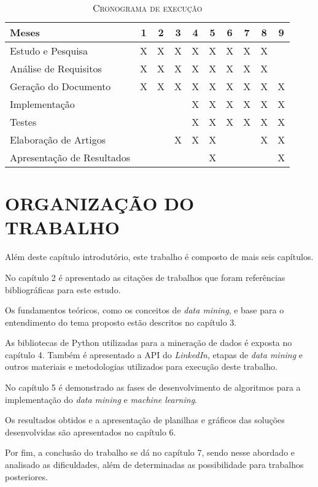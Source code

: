 \renewcommand{\arraystretch}{1.5}

\begin{table}[h!]
  \centering
  \caption{\textsc{Cronograma de execução}}
  \vspace{-0.3cm}
  \begin{tabular}{ | l | c | c | c | c | c | c | c | c | c | }
    \hline
    \textbf{Meses} & \textbf{1} & \textbf{2} & \textbf{3} & \textbf{4} & \textbf{5} & \textbf{6} & \textbf{7} & \textbf{8} & \textbf{9} \\ \hline
    Estudo e Pesquisa & X & X & X & X & X & X & X & X &  \\ \hline
    Análise de Requisitos & X & X & X & X & X & X & X & X &  \\ \hline
    Geração do Documento & X & X & X & X & X & X & X & X & X \\ \hline
    Implementação &  &  &  & X & X & X & X & X & X \\ \hline
    Testes &  &  &  & X & X & X & X & X & X \\ \hline
    Elaboração de Artigos &  &  & X & X & X &  &  & X & X \\ \hline
    Apresentação de Resultados &  &  &  &  & X &  &  &  & X \\
    \hline
  \end{tabular}
  \label{cronograma}
\end{table}


\section{ORGANIZAÇÃO DO TRABALHO}\label{sec:organizacao-trabalho}

Além deste capítulo introdutório, este trabalho é composto de mais seis capítulos.

No capítulo 2 é apresentado as citações de trabalhos que foram referências bibliográficas para este estudo.

Os fundamentos teóricos, como os conceitos de \textit{data mining}, e base para o entendimento do tema proposto estão descritos no capítulo 3.

As bibliotecas de Python utilizadas para a mineração de dados é exposta no capítulo 4. Também é apresentado a API do \textit{LinkedIn}, etapas de \textit{data mining} e outros materiais e metodologias utilizados para execução deste trabalho.

No capítulo 5 é demonstrado as fases de desenvolvimento de algoritmos para a implementação do \textit{data mining} e \textit{machine learning}.

Os resultados obtidos e a apresentação de planilhas e gráficos das soluções desenvolvidas são apresentados no capítulo 6.

Por fim, a conclusão do trabalho se dá no capítulo 7, sendo nesse abordado e analisado as dificuldades, além de determinadas as possibilidade para trabalhos posteriores.
